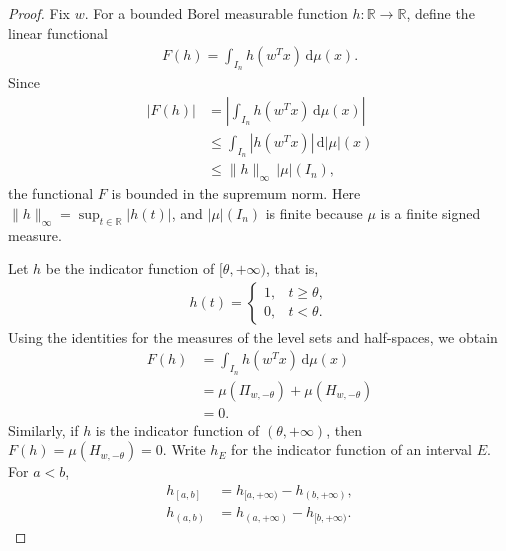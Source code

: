\documentclass[12pt]{article}
\begin{document}
\begin{proof}
Fix $w$. For a bounded Borel measurable function $h:\mathbb{R}\to\mathbb{R}$, define the linear functional
\begin{align*}
    F(h) = \int_{I_n} h(w^T x) \, \mathrm{d}\mu(x).
\end{align*}
Since
\begin{align*}
\left|F(h)\right| &= \left|\int_{I_n} h(w^T x) \, \mathrm{d}\mu(x)\right| \\
&\leq \int_{I_n}|h(w^Tx)|\,\mathrm{d}|\mu|(x) \\
&\leq \lVert h\rVert_\infty\,|\mu|(I_n),
\end{align*}
the functional $F$ is bounded in the supremum norm. Here $\lVert h\rVert_\infty=\sup_{t\in\mathbb{R}}|h(t)|$, and $|\mu|(I_n)$ is finite because $\mu$ is a finite signed measure.

Let $h$ be the indicator function of $[\theta,+\infty)$, that is,
\begin{align*}
    h(t) = \begin{cases}
        1, & t \geq \theta, \\
        0, & t < \theta.
    \end{cases}
\end{align*}
Using the identities for the measures of the level sets and half-spaces, we obtain
\begin{align*}
    F(h) &= \int_{I_n} h(w^T x) \, \mathrm{d}\mu(x) \\
    &= \mu(\Pi_{w, -\theta}) + \mu(H_{w, -\theta}) \\
    &= 0.
\end{align*}
Similarly, if $h$ is the indicator function of $(\theta,+\infty)$, then $F(h)=\mu(H_{w,-\theta})=0$. Write $h_E$ for the indicator function of an interval $E$. For $a<b$,
\begin{align*}
    h_{[a,b]}&=h_{[a,+\infty)}-h_{(b,+\infty)},\\
    h_{(a,b)}&=h_{(a,+\infty)}-h_{[b,+\infty)}.
\end{align*}


\end{proof}
\end{document}
